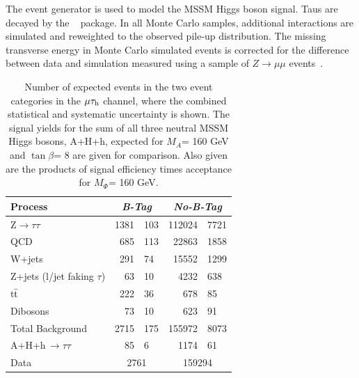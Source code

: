 The event generator \PYTHIA is used to model the MSSM Higgs boson signal.
Taus are decayed by the \TAUOLA~\cite{TAUOLA} package.
In all Monte Carlo  samples, additional interactions are simulated and reweighted to the observed pile-up distribution.  
The missing transverse energy in Monte Carlo simulated events is corrected for the difference between data and simulation 
measured using a sample of $Z\rightarrow\mu\mu$ events~\cite{CMS-EWK-WZ}.


\begin{table}[!h]
  \begin{center}
    \caption{Number of expected events in the two event categories in the $\mathrm{\mu}\mathrm{\tau}_{\rm h}$ channel, where the combined statistical and systematic uncertainty is shown. 
      The signal yields for the sum of all three neutral MSSM Higgs bosons, A+H+h, expected for $M_{A}$= 160 GeV and $\tan\beta$= 8 are given for comparison.
      Also given are the products of signal efficiency times acceptance for $M_{\Phi}$= 160 GeV.}
\begin{tabular}{|l|r@{$ \,\,\pm\,\, $}l|r@{$ \,\,\pm\,\, $}l|} 
\hline 
Process & \multicolumn{2}{c|}{\emph{B-Tag}} & \multicolumn{2}{c|}{\emph{No-B-Tag}}\\ 
\hline 
Z$\rightarrow \tau\tau$          &       1381    &       103     &       112024  &       7721    \\ 
\hline 
QCD                              &       685     &       113     &       22863   &       1858    \\ 
\hline 
W+jets                           &       291     &       74      &       15552   &       1299    \\ 
\hline 
Z+jets (l/jet faking $\tau$)     &       63      &       10      &       4232    &       638     \\ 
\hline 
t$\bar{\rm{t}}$                  &       222     &       36      &       678     &       85      \\ 
\hline 
Dibosons                         &       73      &       10      &       623     &       91      \\ 
\hline 
\hline 
Total Background                 &       2715    &       175     &       155972  &       8073    \\ 
\hline 
A+H+h\,$\rightarrow\tau\tau$           &       85      &       6     &       1174     &       61      \\ 
\hline 
Data                             & \multicolumn{2}{|c|}{2761}    & \multicolumn{2}{|c|}{159294}  \\ 

\end{tabular}
\end{center}
\end{table}
